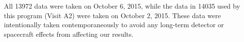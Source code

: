 \documentclass[12pt]{reportj}
\begin{document}
All 13972 data were taken on October 6, 2015, while the data in 14035 used by this program (Visit A2) were taken on October 2, 2015.
These data were intentionally taken contemporaneously to avoid any long-term detector or spacecraft effects from affecting our results.\\

\newpage

\lhead{}
\rhead{}

\clearpage
\end{document}
